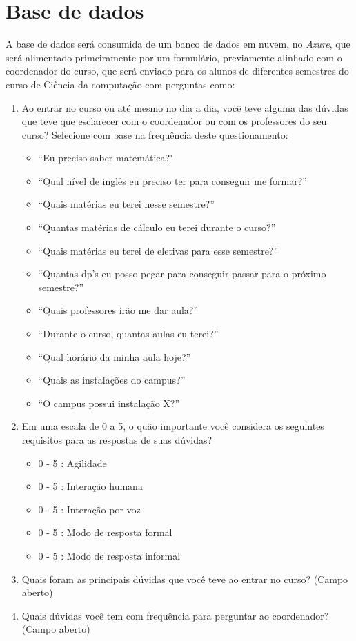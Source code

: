 \documentclass[
	12pt,				%
	oneside,
	a4paper,			%
	english,			%
	french,				%
	spanish,			%
	brazil				%
	]{abntex2}
\begin{document}
\section{Base de dados}
A base de dados será consumida de um banco de dados em nuvem, no \emph{Azure}, que será alimentado primeiramente por um formulário, previamente alinhado com o coordenador do curso, que será enviado para os alunos de diferentes semestres do curso de Ciência da computação com perguntas como:
\begin{enumerate}
\item Ao entrar no curso ou até mesmo no dia a dia, você teve alguma das dúvidas que teve que esclarecer com o coordenador ou com os professores do seu curso? Selecione com base na frequência deste questionamento:
\begin{itemize}
\item “Eu preciso saber matemática?"
\item “Qual nível de inglês eu preciso ter para conseguir me formar?”
\item “Quais matérias eu terei nesse semestre?”
\item “Quantas matérias de cálculo eu terei durante o curso?”
\item “Quais matérias eu terei de eletivas para esse semestre?”
\item “Quantas dp’s eu posso pegar para conseguir passar para o próximo semestre?”
\item “Quais professores irão me dar aula?”
\item “Durante o curso, quantas aulas eu terei?”
\item “Qual horário da minha aula hoje?”
\item “Quais as instalações do campus?”
\item“O campus possui instalação X?”
\end{itemize}

\item Em uma escala de 0 a 5, o quão importante você considera os seguintes requisitos para as respostas de suas dúvidas?
\begin{itemize}
\item 0 - 5 : Agilidade
\item 0 - 5 : Interação humana
\item 0 - 5 : Interação por voz
\item 0 - 5 : Modo de resposta formal
\item 0 - 5 : Modo de resposta informal
\end{itemize}

\item Quais foram as principais dúvidas que você teve ao entrar no curso? (Campo aberto)
\item Quais dúvidas você tem com frequência para perguntar ao coordenador? (Campo aberto)
\end{enumerate}
\end{document}
